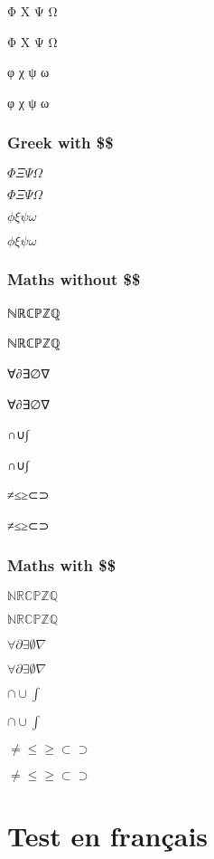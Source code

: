 \documentclass[a4paper,10pt]{article}
\begin{document}
{\Reference Φ Χ Ψ Ω}

{\Fontify Φ Χ Ψ Ω}


{\Reference φ χ ψ ω}

{\Fontify φ χ ψ ω}


\subsubsection{Greek with \$\$}

{\Reference $\Phi \Xi \Psi \Omega$}

{\Fontify $\Phi \Xi \Psi \Omega$}


{\Reference $\phi \xi \psi \omega$}

{\Fontify $\phi \xi \psi \omega$}


\subsubsection{Maths without \$\$}

{\Reference ℕℝℂℙℤℚ}

{\Fontify ℕℝℂℙℤℚ}


{\Reference ∀∂∃∅∇}

{\Fontify ∀∂∃∅∇}


{\Reference ∩∪∫}

{\Fontify ∩∪∫}


{\Reference ≠≤≥⊂⊃}

{\Fontify ≠≤≥⊂⊃}


\subsubsection{Maths with \$\$}

{\Reference $\mathbb{N} \mathbb{R} \mathbb{C} \mathbb{P} \mathbb{Z} \mathbb{Q}$}

{\Fontify $\mathbb{N} \mathbb{R} \mathbb{C} \mathbb{P} \mathbb{Z} \mathbb{Q}$}


{\Reference $\forall \partial \exists \emptyset \nabla$}

{\Fontify $\forall \partial \exists \emptyset \nabla$}


{\Reference $\cap \cup \int$}

{\Fontify $\cap \cup \int$}


{\Reference $\neq \leq \geq \subset \supset$}

{\Fontify $\neq \leq \geq \subset \supset$}



\section{Test en français}
\end{document}
